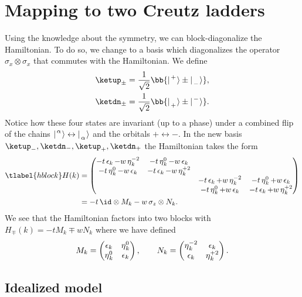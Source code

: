\section{Mapping to two Creutz ladders}
Using the knowledge about the symmetry, we can block-diagonalize the Hamiltonian. To do so, we change to a basis which diagonalizes the operator $\sigma_x \otimes \sigma_x$ that commutes with the Hamiltonian. We define
\begin{align}
    \ketup_\pm = \frac{1}{\sqrt{2}} \bb{ \upp \pm \dnm }, \\
    \ketdn_\pm = \frac{1}{\sqrt{2}} \bb{ \dnp \pm \upm }.
\end{align}
Notice how these four states are invariant (up to a phase) under a combined flip of the chains $\ladderKet{\alpha}{} \leftrightarrow \ladderKet{}{\alpha}$ and the orbitals $+ \leftrightarrow -$.
In the new basis $\ketup_-, \ketdn_-, \ketup_+, \ketdn_+$ the Hamiltonian takes the form
\begin{align} \tlabel{hblock}
    H(k) &=
    \begin{pmatrix}
        -t\ep_k -w\et_k^{-2} & -t\et_k^0 -w\ep_k &  &  \\
        -t\et^0_k - w\ep_k & -t \ep_k - w\et_k^{+2} &  &  \\
         &  & -t\ep_k +w\et_k^{-2} & -t\et_k^0 +w\ep_k \\
         &  & -t\et^0_k + w\ep_k & -t \ep_k + w\et_k^{+2}
    \end{pmatrix} \\
    &= - t \, \id \otimes M_k - w \, \sigma_z \otimes N_k.
\end{align}
We see that the Hamiltonian factors into two blocks with $H_\mp(k) = -t M_k \mp w N_k$ where we have defined
\begin{align}
    M_k = \begin{pmatrix}
        \operatorname{\epsilon}_k & \operatorname{\eta}_k^0 \\
        \operatorname{\eta}_k^0 & \operatorname{\epsilon}_k
    \end{pmatrix},\qquad
    N_k = \begin{pmatrix}
    \operatorname{\eta}_k^{-2} & \operatorname{\epsilon}_k \\
    \operatorname{\epsilon}_k & \operatorname{\eta}_k^{+2}
    \end{pmatrix}.
\end{align}

\subsection{Idealized model}


